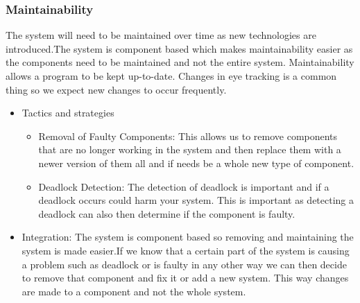 \subsubsection{Maintainability}
\begin{flushleft}
The system will need to be maintained over time as new technologies are introduced.The system is component based which makes maintainability easier as the components need to be maintained and not the entire system. Maintainability allows a program to be kept up-to-date. Changes in eye tracking is a common thing so we expect new changes to occur frequently.
\begin{itemize}
\item{Tactics and strategies}
\begin{itemize}
\item{Removal of Faulty Components}: This allows us to remove components that are no longer working in the system and then replace them with a newer version of them all and if needs be a whole new type of component.
\item{Deadlock Detection}: The detection of deadlock is important and if a deadlock occurs could harm your system. This is important as detecting a deadlock can also then determine if the component is faulty.
\end{itemize}

\item{Integration}: The system is component based so removing and maintaining the system is made easier.If we know that a certain part of the system is causing a problem such as deadlock or is faulty in any other way we can then  decide to remove that component and fix it or add a new system. This way changes are made to a component and not the whole system.
\end{itemize}

\end{flushleft}
		
